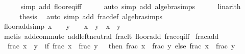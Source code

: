 \begin{isabellebody}
\ \ \ \ \isamarkupfalse%
\ {\isacharparenleft}{\kern0pt}simp\ add{\isacharcolon}{\kern0pt}\ floor{\isacharunderscore}{\kern0pt}eq{\isacharunderscore}{\kern0pt}iff{\isacharparenright}{\kern0pt}\isanewline
\ \ \ \ \isamarkupfalse%
\ {\isacharparenleft}{\kern0pt}auto\ simp\ add{\isacharcolon}{\kern0pt}\ algebra{\isacharunderscore}{\kern0pt}simps{\isacharparenright}{\kern0pt}\isanewline
\ \ \ \ \isamarkupfalse%
\ linarith\isanewline
\ \ \ \ \isamarkupfalse%
\isanewline
\ \ \isamarkupfalse%
\ \isamarkupfalse%
\ {\isacharquery}{\kern0pt}thesis\ \isamarkupfalse%
\ {\isacharparenleft}{\kern0pt}auto\ simp\ add{\isacharcolon}{\kern0pt}\ frac{\isacharunderscore}{\kern0pt}def\ algebra{\isacharunderscore}{\kern0pt}simps{\isacharparenright}{\kern0pt}\isanewline
{}\isamarkupfalse%
%
\endisatagproof
{\isafoldproof}%
%
\isadelimproof
\isanewline
%
\endisadelimproof
\isanewline
{}\isamarkupfalse%
\ floor{\isacharunderscore}{\kern0pt}add{}{\isacharbrackleft}{\kern0pt}simp{\isacharbrackright}{\kern0pt}{\isacharcolon}{\kern0pt}\ {\isachardoublequoteopen}x\ {\isasymin}\ {\isasymint}\ {\isasymor}\ y\ {\isasymin}\ {\isasymint}\ {\isasymLongrightarrow}\ {\isasymlfloor}x\ {\isacharplus}{\kern0pt}\ y{\isasymrfloor}\ {\isacharequal}{\kern0pt}\ {\isasymlfloor}x{\isasymrfloor}\ {\isacharplus}{\kern0pt}\ {\isasymlfloor}y{\isasymrfloor}{\isachardoublequoteclose}\isanewline
%
\isadelimproof
%
\endisadelimproof
%
\isatagproof
{}\isamarkupfalse%
\ {\isacharparenleft}{\kern0pt}metis\ add{\isachardot}{\kern0pt}commute\ add{\isachardot}{\kern0pt}left{\isacharunderscore}{\kern0pt}neutral\ frac{\isacharunderscore}{\kern0pt}lt{\isacharunderscore}{\kern0pt}{}\ floor{\isacharunderscore}{\kern0pt}add\ frac{\isacharunderscore}{\kern0pt}eq{\isacharunderscore}{\kern0pt}{}{\isacharunderscore}{\kern0pt}iff{\isacharparenright}{\kern0pt}%
\endisatagproof
{\isafoldproof}%
%
\isadelimproof
\isanewline
%
\endisadelimproof
\isanewline
{}\isamarkupfalse%
\ frac{\isacharunderscore}{\kern0pt}add{\isacharcolon}{\kern0pt}\isanewline
\ \ {\isachardoublequoteopen}frac\ {\isacharparenleft}{\kern0pt}x\ {\isacharplus}{\kern0pt}\ y{\isacharparenright}{\kern0pt}\ {\isacharequal}{\kern0pt}\ {\isacharparenleft}{\kern0pt}if\ frac\ x\ {\isacharplus}{\kern0pt}\ frac\ y\ {\isacharless}{\kern0pt}\ {}\ then\ frac\ x\ {\isacharplus}{\kern0pt}\ frac\ y\ else\ {\isacharparenleft}{\kern0pt}frac\ x\ {\isacharplus}{\kern0pt}\ frac\ y{\isacharparenright}{\kern0pt}\ {\isacharminus}{\kern0pt}\ {}{\isacharparenright}{\kern0pt}{\isachardoublequoteclose}\isanewline

\end{isabellebody}
